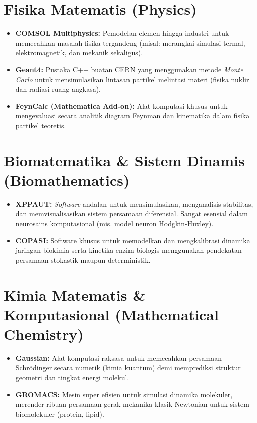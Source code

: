 \documentclass[11pt, a4paper, numbers=enddot, oneside]{scrbook}
\begin{document}
\section{Fisika Matematis (Physics)}

\begin{itemize}
    \item \textbf{COMSOL Multiphysics:} Pemodelan elemen hingga industri untuk memecahkan masalah fisika tergandeng (misal: merangkai simulasi termal, elektromagnetik, dan mekanik sekaligus).
    \item \textbf{Geant4:} Pustaka C++ buatan CERN yang menggunakan metode \emph{Monte Carlo} untuk mensimulasikan lintasan partikel melintasi materi (fisika nuklir dan radiasi ruang angkasa).
    \item \textbf{FeynCalc (Mathematica Add-on):} Alat komputasi khusus untuk mengevaluasi secara analitik diagram Feynman dan kinematika dalam fisika partikel teoretis.
\end{itemize}

\section{Biomatematika \& Sistem Dinamis (Biomathematics)}

\begin{itemize}
    \item \textbf{XPPAUT:} \emph{Software} andalan untuk mensimulasikan, menganalisis stabilitas, dan memvisualisasikan sistem persamaan diferensial. Sangat esensial dalam neurosains komputasional (mis. model neuron Hodgkin-Huxley).
    \item \textbf{COPASI:} Software khusus untuk memodelkan dan mengkalibrasi dinamika jaringan biokimia serta kinetika enzim biologis menggunakan pendekatan persamaan stokastik maupun deterministik.
\end{itemize}

\section{Kimia Matematis \& Komputasional (Mathematical Chemistry)}

\begin{itemize}
    \item \textbf{Gaussian:} Alat komputasi raksasa untuk memecahkan persamaan Schrödinger secara numerik (kimia kuantum) demi memprediksi struktur geometri dan tingkat energi molekul.
    \item \textbf{GROMACS:} Mesin super efisien untuk simulasi dinamika molekuler, merender ribuan persamaan gerak mekanika klasik Newtonian untuk sistem biomolekuler (protein, lipid).
\end{itemize}
\end{document}
